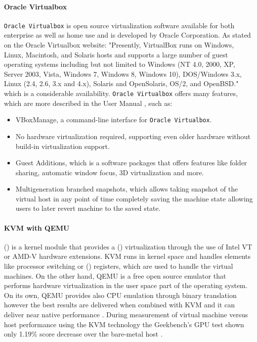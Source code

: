 \paragraph{Oracle Virtualbox}
\texttt{Oracle Virtualbox} is open source virtualization software available for both enterprise as well as home use and is developed by Oracle Corporation. As stated on the Oracle Virtualbox website: "Presently, VirtualBox runs on Windows, Linux, Macintosh, and Solaris hosts and supports a large number of guest operating systems including but not limited to Windows (NT 4.0, 2000, XP, Server 2003, Vista, Windows 7, Windows 8, Windows 10), DOS/Windows 3.x, Linux (2.4, 2.6, 3.x and 4.x), Solaris and OpenSolaris, OS/2, and OpenBSD." \cite{oraclehome} which is a considerable availability. \texttt{Oracle Virtualbox} offers many features, which are more described in the User Manual \cite{oracledatasheet}, such as:
\begin{itemize}
	\item VBoxManage, a command-line interface for \texttt{Oracle Virtualbox}.
	\item No hardware virtualization required, supporting even older hardware without build-in virtualization support. 
	\item Guest Additions, which is a software packages that offers features like folder sharing, automatic window focus, 3D virtualization and more.
	\item Multigeneration branched snapshots, which allows taking snapshot of the virtual host in any point of time completely saving the machine state allowing users to later revert machine to the saved state.
\end{itemize}
\paragraph{KVM with QEMU}
 () is a kernel module that provides a  () virtualization through the use of Intel VT or AMD-V hardware extensions. KVM runs in kernel space and handles elements like processor switching or  () registers, which are used to handle the virtual machines. On the other hand, QEMU is a free open source emulator that performs hardware virtualization in the user space part of the operating system. On its own, QEMU provides also CPU emulation through binary translation however the best results are delivered when combined with KVM and it can deliver near native performance \cite{kvmspeed}. During measurement of virtual machine versus host performance using the KVM technology the Geekbench’s GPU test shown only 1.19\% score decrease over the bare-metal host \cite{kvmbenchmark}.


